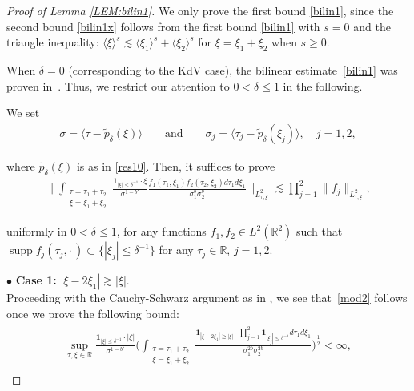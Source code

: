 \documentclass[letterpaper, 11pt,  reqno]{amsart}
\DeclareMathOperator*{\intt}{\int}
\DeclareMathOperator*{\supp}{supp}
\newcommand{\1}{\hspace{0.5mm}\textup{I}\hspace{0.5mm}}
\newcommand{\noi}{\noindent}
\newcommand{\R}{\mathbb{R}}
\newcommand{\bul}{\bullet}
\newcommand{\dl}{\delta}
\newcommand{\s}{\sigma}
\newcommand{\wt}{\widetilde}
\newcommand{\les}{\lesssim}
\newcommand{\ges}{\gtrsim}
\newcommand{\jb}[1]
{\langle #1 \rangle}
\newcommand{\ind}{\mathbf 1}
\numberwithin{equation}{section}
\numberwithin{theorem}{section}
\begin{document}
\begin{proof}[Proof of Lemma \ref{LEM:bilin1}]
We only prove the first bound \eqref{bilin1},
since the second bound \eqref{bilin1x}
follows from 
the first bound \eqref{bilin1}
with $s = 0$
and the triangle inequality: $\jb{\xi}^s \les \jb{\xi_1}^s + \jb{\xi_2}^s$
for $\xi = \xi_1 + \xi_2$ when $s \ge 0$.

When $\dl = 0$ (corresponding to the KdV case), 
the bilinear estimate~\eqref{bilin1} 
was proven in~\cite{KPV96}.
Thus, we restrict our attention to $0 < \dl \le 1$ in the following.




We set 
\begin{align}
\s = \jb{\tau - \wt p_\dl(\xi)}
\qquad \text{and}\qquad 
\s_j = \jb{\tau_j - \wt p_\dl(\xi_j)}, \quad j = 1, 2, 
\label{mod1}
\end{align}

\noi
where $\wt p_\dl(\xi)$ is as in \eqref{res10}.
Then, 
it suffices to prove
\begin{align}
\bigg\|
\intt_{\substack{\tau = \tau_1 + \tau_2\\\xi = \xi_1 + \xi_2}}
\frac{\ind_{  |\xi|\le  \dl^{-1}} \cdot \xi}{\s^{1-b'}}
\frac{ f_1(\tau_1, \xi_1)f_2(\tau_2, \xi_2) d\tau_1 d\xi_1}
{\s_1^{b}
\s_2^{b}}
\bigg\|_{L^2_{\tau, \xi}}
\les \prod_{j = 1}^2 \|f_j\|_{L^2_{\tau, \xi}}, 
\label{mod2}
\end{align}

\noi
uniformly in $0 < \dl \le1$, 
for any functions $f_1, f_2 \in L^2(\R^2)$
such that 
$\supp f_j(\tau_j, \cdot\,) \subset \{|\xi_j|\le   \dl^{-1}\}$
for any $\tau_j \in \R$, $j = 1, 2$.



\medskip



\noi
$\bul$ {\bf Case 1:}
$|\xi - 2\xi_1|\ges |\xi|$.
\\
\indent
Proceeding with the 
 Cauchy-Schwarz argument as in \cite{KPV96}, 
 we see that~\eqref{mod2} follows once we prove 
 the following bound: 
 \begin{align}
\begin{split}
 \sup_{\tau, \xi \in \R} \frac{\ind_{  |\xi|\le   \dl^{-1}}\cdot |\xi|}{\s^{1-b'}}
 \bigg(\intt_{\substack{\tau = \tau_1 + \tau_2\\\xi= \xi_1 + \xi_2}}
\frac{
\ind_{|\xi - 2\xi_1|\ges |\xi|}\cdot 
\prod_{j = 1}^2 \ind_{ |\xi_j|\le   \dl^{-1}} d\tau_1 d\xi_1}
{\s_1^{2b}
\s_2^{2b}}
\bigg)^\frac 12 
< \infty, 
\end{split}
\label{BD1}
\end{align}


\end{proof}
\end{document}

